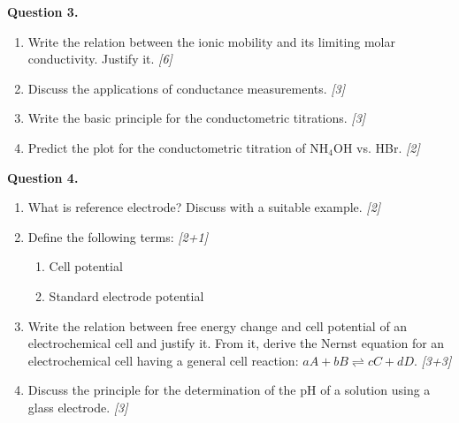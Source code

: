 \documentclass[11pt,a4paper]{article}
\newcommand{\pts}[1]{\hfill \textit{[#1]}}
\begin{document}
\bigskip

\noindent \textbf{Question 3.}
\begin{enumerate}[label=(\alph*)]
  \item Write the relation between the ionic mobility and its limiting molar conductivity. Justify it. \pts{6}
  \item Discuss the applications of conductance measurements. \pts{3}
  \item Write the basic principle for the conductometric titrations. \pts{3}
  \item Predict the plot for the conductometric titration of $\text{NH}_4\text{OH}$ vs. HBr. \pts{2}
\end{enumerate}

\bigskip

\noindent \textbf{Question 4.}
\begin{enumerate}[label=(\alph*)]
  \item What is reference electrode? Discuss with a suitable example. \pts{2}
  \item Define the following terms: \pts{2+1}
  \begin{enumerate}[label=(\roman*)]
    \item Cell potential
    \item Standard electrode potential
  \end{enumerate}
  \item Write the relation between free energy change and cell potential of an electrochemical cell and justify it. From it, derive the Nernst equation for an electrochemical cell having a general cell reaction: $aA + bB \rightleftharpoons cC + dD$. \pts{3+3}
  \item Discuss the principle for the determination of the pH of a solution using a glass electrode. \pts{3}
\end{enumerate}

\bigskip
\end{document}
